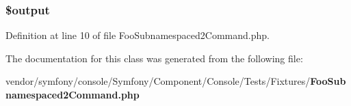 \subsubsection[{\$output}]{\setlength{\rightskip}{0pt plus 5cm}\$output}\label{class_foo_subnamespaced2_command_a73004ce9cd673c1bfafd1dc351134797}


Definition at line 10 of file Foo\+Subnamespaced2\+Command.\+php.



The documentation for this class was generated from the following file\+:\begin{DoxyCompactItemize}
\item 
vendor/symfony/console/\+Symfony/\+Component/\+Console/\+Tests/\+Fixtures/{\bf Foo\+Subnamespaced2\+Command.\+php}\end{DoxyCompactItemize}
